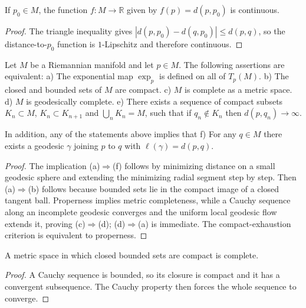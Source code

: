 \begin{corollary}

  \label{cor:dc-ch7-2-7}


If $p_0\in M$, the function $f:M\to\mathbb{R}$ given by $f(p)=d(p,p_0)$ is
  continuous.
\end{corollary}
\begin{proof}


\sketch The triangle inequality gives $|d(p,p_0)-d(q,p_0)|\le d(p,q)$, so the distance-to-$p_0$ function is $1$-Lipschitz and therefore continuous.
\end{proof}

\begin{theorem}
  \label{thm:dc-ch7-2-8}

  Let $M$ be a Riemannian manifold and let $p\in M$. The following assertions are
  equivalent:
a) The exponential map $\exp_p$ is defined on all of $T_p(M)$.
b) The closed and bounded sets of $M$ are compact.
c) $M$ is complete as a metric space.
d) $M$ is geodesically complete.
e) There exists a sequence of compact subsets $K_n\subset M$, $K_n\subset K_{n+1}$
     and $\bigcup_n K_n=M$, such that if $q_n\notin K_n$ then $d(p,q_n)\to\infty$.

In addition, any of the statements above implies that
f) For any $q\in M$ there exists a geodesic $\gamma$ joining $p$ to $q$ with
     $\ell(\gamma)=d(p,q)$.
\end{theorem}
\begin{proof}


\sketch The implication (a)$\Rightarrow$(f) follows by minimizing distance on a small geodesic sphere and extending the minimizing radial segment step by step. Then (a)$\Rightarrow$(b) follows because bounded sets lie in the compact image of a closed tangent ball. Properness implies metric completeness, while a Cauchy sequence along an incomplete geodesic converges and the uniform local geodesic flow extends it, proving (c)$\Rightarrow$(d); (d)$\Rightarrow$(a) is immediate. The compact-exhaustion criterion is equivalent to properness.
\end{proof}

\begin{lemma}

  \label{lem:dc-ch7-2-8-b-to-c}


A metric space in which closed bounded sets are compact is complete.
\end{lemma}
\begin{proof}
\sketch A Cauchy sequence is bounded, so its closure is compact and it has a
  convergent subsequence. The Cauchy property then forces the whole sequence to
  converge.
\end{proof}


